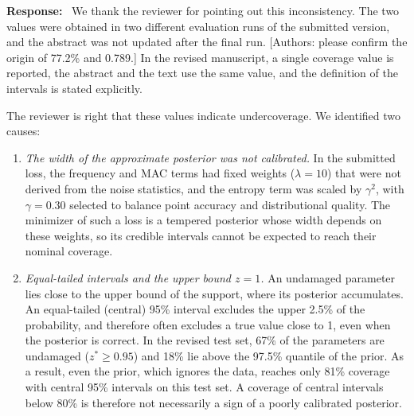 \documentclass[11pt]{article}
\newenvironment{response}{\par\smallskip\noindent\color{resp}\textbf{Response:}\ }{\par}
\newcommand{\authornote}[1]{\textcolor{note}{\textsf{[Authors: #1]}}}
\begin{document}
\begin{response}
We thank the reviewer for pointing out this inconsistency. The two values were obtained in two different evaluation
runs of the submitted version, and the abstract was not updated after the final run.
\authornote{please confirm the origin of 77.2\% and 0.789.} In the revised manuscript, a single coverage value is
reported, the abstract and the text use the same value, and the definition of the intervals is stated explicitly.

The reviewer is right that these values indicate undercoverage. We identified two causes:
\begin{enumerate}[leftmargin=*]
\item \emph{The width of the approximate posterior was not calibrated.} In the submitted loss, the frequency and MAC
terms had fixed weights ($\lambda=10$) that were not derived from the noise statistics, and the entropy term was
scaled by $\gamma^2$, with $\gamma=0.30$ selected to balance point accuracy and distributional quality. The minimizer of such a loss is a tempered posterior
whose width depends on these weights, so its credible intervals cannot be expected to reach their nominal coverage.
\item \emph{Equal-tailed intervals and the upper bound $z=1$.} An undamaged parameter lies close to the upper bound of
the support, where its posterior accumulates. An equal-tailed (central) 95\% interval excludes the upper 2.5\% of the
probability, and therefore often excludes a true value close to 1, even when the posterior is correct. In the revised
test set, 67\% of the parameters are undamaged ($z^*\ge0.95$) and 18\% lie above the 97.5\% quantile of the prior. As a
result, even the prior, which ignores the data, reaches only 81\% coverage with central 95\% intervals on this test set.
A coverage of central intervals below 80\% is therefore not necessarily a sign of a poorly calibrated posterior.
\end{enumerate}


\end{response}
\end{document}
